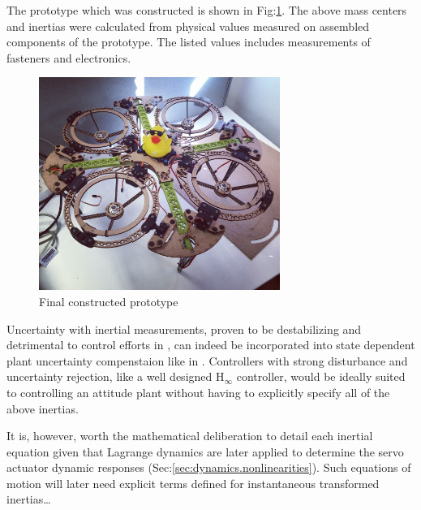 The prototype which was constructed is shown in Fig:\ref{fig:ducky}. The above mass centers and inertias were calculated from physical values measured on assembled components of the prototype. The listed values includes measurements of fasteners and electronics.
\begin{figure}[hbtp]
\centering
\includegraphics[width=0.7\textwidth]{figs/ducky}
\vspace{-6pt}
\caption{Final constructed prototype}
\vspace{-12pt}
\label{fig:ducky}
\end{figure}
\par
Uncertainty with inertial measurements, proven to be destabilizing and detrimental to control efforts in \cite{inertiafree,inertiaspin}, can indeed be incorporated into state dependent plant uncertainty  compenstaion like in \cite{intelligentbackstep}. Controllers with strong disturbance and uncertainty rejection, like a well designed $\text{H}_\infty$ controller, would be ideally suited to controlling an attitude plant without having to explicitly specify all of the above inertias. 
\par
It is, however, worth the mathematical deliberation to detail each inertial equation given that Lagrange dynamics are later applied to determine the servo actuator dynamic responses (Sec:\ref{sec:dynamics.nonlinearities}). Such equations of motion will later need explicit terms defined for instantaneous transformed inertias\ldots
\newpage
